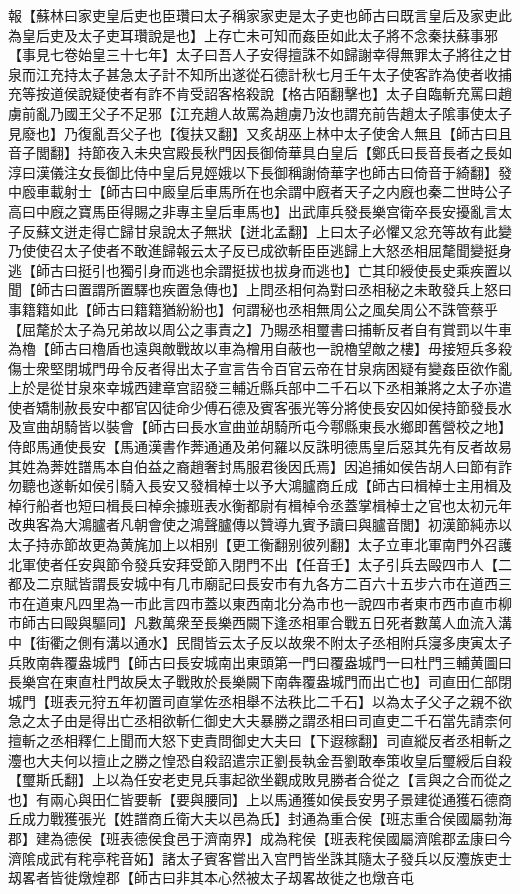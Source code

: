 報【蘇林曰家吏皇后吏也臣瓚曰太子稱家家吏是太子吏也師古曰既言皇后及家吏此為皇后吏及太子吏耳瓚說是也】上存亡未可知而姦臣如此太子將不念秦扶蘇事邪【事見七卷始皇三十七年】太子曰吾人子安得擅誅不如歸謝幸得無罪太子將往之甘泉而江充持太子甚急太子計不知所出遂從石德計秋七月壬午太子使客詐為使者收捕充等按道侯說疑使者有詐不肯受詔客格殺說【格古陌翻擊也】太子自臨斬充罵曰趙虜前亂乃國王父子不足邪【江充趙人故罵為趙虜乃汝也謂充前告趙太子隂事使太子見廢也】乃復亂吾父子也【復扶又翻】又炙胡巫上林中太子使舍人無且【師古曰且音子閭翻】持節夜入未央宫殿長秋門因長御倚華具白皇后【鄭氏曰長音長者之長如淳曰漢儀注女長御比侍中皇后見娙娥以下長御稱謝倚華字也師古曰倚音于綺翻】發中廏車載射士【師古曰中廄皇后車馬所在也余謂中廐者天子之内廐也秦二世時公子高曰中廐之寶馬臣得賜之非專主皇后車馬也】出武庫兵發長樂宫衛卒長安擾亂言太子反蘇文迸走得亡歸甘泉說太子無狀【迸北孟翻】上曰太子必懼又忿充等故有此變乃使使召太子使者不敢進歸報云太子反已成欲斬臣臣逃歸上大怒丞相屈氂聞變挺身逃【師古曰挺引也獨引身而逃也余謂挺拔也拔身而逃也】亡其印綬使長史乘疾置以聞【師古曰置謂所置驛也疾置急傳也】上問丞相何為對曰丞相秘之未敢發兵上怒曰事籍籍如此【師古曰籍籍猶紛紛也】何謂秘也丞相無周公之風矣周公不誅管蔡乎【屈氂於太子為兄弟故以周公之事責之】乃賜丞相璽書曰捕斬反者自有賞罰以牛車為櫓【師古曰櫓盾也遠與敵戰故以車為橧用自蔽也一說櫓望敵之樓】毋接短兵多殺傷士衆堅閉城門毋令反者得出太子宣言告令百官云帝在甘泉病困疑有變姦臣欲作亂上於是從甘泉來幸城西建章宫詔發三輔近縣兵部中二千石以下丞相兼將之太子亦遣使者矯制赦長安中都官囚徒命少傅石德及賓客張光等分將使長安囚如侯持節發長水及宣曲胡騎皆以裝會【師古曰長水宣曲並胡騎所屯今鄠縣東長水鄉即舊營校之地】侍郎馬通使長安【馬通漢書作莾通通及弟何羅以反誅明德馬皇后惡其先有反者故易其姓為莾姓譜馬本自伯益之裔趙奢封馬服君後因氏焉】因追捕如侯告胡人曰節有詐勿聽也遂斬如侯引騎入長安又發楫棹士以予大鴻臚商丘成【師古曰楫棹士主用楫及棹行船者也短曰楫長曰棹余據班表水衡都尉有楫棹令丞蓋掌楫棹士之官也太初元年改典客為大鴻臚者凡朝會使之鴻聲臚傳以贊導九賓予讀曰與臚音閭】初漢節純赤以太子持赤節故更為黄旄加上以相别【更工衡翻别彼列翻】太子立車北軍南門外召護北軍使者任安與節令發兵安拜受節入閉門不出【任音壬】太子引兵去毆四市人【二都及二京賦皆謂長安城中有几市廟記曰長安市有九各方二百六十五步六市在道西三市在道東凡四里為一市此言四市蓋以東西南北分為市也一說四市者東市西市直市柳市師古曰毆與驅同】凡數萬衆至長樂西闕下逢丞相軍合戰五日死者數萬人血流入溝中【街衢之側有溝以通水】民間皆云太子反以故衆不附太子丞相附兵寖多庚寅太子兵敗南犇覆盎城門【師古曰長安城南出東頭第一門曰覆盎城門一曰杜門三輔黄圖曰長樂宫在東直杜門故戾太子戰敗於長樂闕下南犇覆盎城門而出亡也】司直田仁部閉城門【班表元狩五年初置司直掌佐丞相舉不法秩比二千石】以為太子父子之親不欲急之太子由是得出亡丞相欲斬仁御史大夫暴勝之謂丞相曰司直吏二千石當先請柰何擅斬之丞相釋仁上聞而大怒下吏責問御史大夫曰【下遐稼翻】司直縱反者丞相斬之灋也大夫何以擅止之勝之惶恐自殺詔遣宗正劉長執金吾劉敢奉策收皇后璽綬后自殺【璽斯氏翻】上以為任安老吏見兵事起欲坐觀成敗見勝者合從之【言與之合而從之也】有兩心與田仁皆要斬【要與腰同】上以馬通獲如侯長安男子景建從通獲石德商丘成力戰獲張光【姓譜商丘衛大夫以邑為氏】封通為重合侯【班志重合侯國屬勃海郡】建為德侯【班表德侯食邑于濟南界】成為秺侯【班表秺侯國屬濟隂郡孟康曰今濟隂成武有秺亭秺音妬】諸太子賓客嘗出入宫門皆坐誅其隨太子發兵以反灋族吏士刼畧者皆徙燉煌郡【師古曰非其本心然被太子刼畧故徙之也燉咅屯